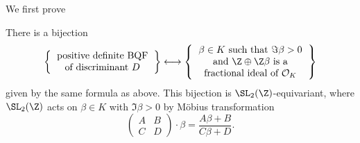 \documentclass[a4paper]{article}
\renewcommand*{\O}{\mathcal{O}}
\begin{document}
We first prove
\begin{proposition}
  There is a bijection
  \[
    \left\{
    \begin{tabular}{c}
      positive definite BQF \\
      of discriminant \(D\)
    \end{tabular}
    \right\}
    \longleftrightarrow
    \left\{
      \begin{tabular}{c}
        \(\beta \in K\) such that \(\Im \beta > 0\) \\
        and \(\Z \oplus \Z \beta\) is a \\
        fractional ideal of \(\O_K\)
      \end{tabular}
    \right\}
  \]
  given by the same formula as above. This bijection is \(\SL_2(\Z)\)-equivariant, where \(\SL_2(\Z)\) acts on \(\beta \in K\) with \(\Im \beta > 0\) by Möbius transformation
  \[
    \begin{pmatrix}
      A & B \\
      C & D
    \end{pmatrix}
    \cdot \beta = \frac{A \beta + B}{C \beta + D}.
  \]
\end{proposition}
\end{document}
